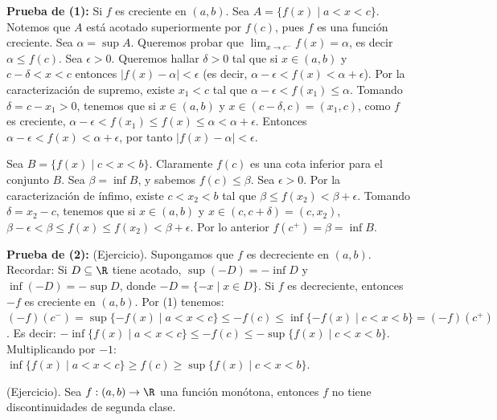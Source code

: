 \begin{dem} %
\textbf{Prueba de (1):} Si $f$ es creciente en $(a,b)$. %
Sea $A = \{f(x) \mid a < x < c\}$. Notemos que $A$ está acotado superiormente por $f(c)$, pues $f$ es una función creciente. %
Sea $\alpha = \sup A$. Queremos probar que $\lim_{x \to c^-} f(x) = \alpha$, es decir $\alpha \le f(c)$. %
Sea $\epsilon > 0$. Queremos hallar $\delta > 0$ tal que si $x \in (a,b)$ y $c - \delta < x < c$ entonces $|f(x) - \alpha| < \epsilon$ (es decir, $\alpha - \epsilon < f(x) < \alpha + \epsilon$). %
Por la caracterización de supremo, existe $x_1 < c$ tal que $\alpha - \epsilon < f(x_1) \le \alpha$. %
Tomando $\delta = c - x_1 > 0$, tenemos que si $x \in (a,b)$ y $x \in (c-\delta, c) = (x_1, c)$, como $f$ es creciente, $\alpha - \epsilon < f(x_1) \le f(x) \le \alpha < \alpha + \epsilon$. %
Entonces $\alpha - \epsilon < f(x) < \alpha + \epsilon$, por tanto $|f(x) - \alpha| < \epsilon$. %

Sea $B = \{f(x) \mid c < x < b\}$. Claramente $f(c)$ es una cota inferior para el conjunto $B$. %
Sea $\beta = \inf B$, y sabemos $f(c) \le \beta$. Sea $\epsilon > 0$. %
Por la caracterización de ínfimo, existe $c < x_2 < b$ tal que $\beta \le f(x_2) < \beta + \epsilon$. %
Tomando $\delta = x_2 - c$, tenemos que si $x \in (a,b)$ y $x \in (c, c+\delta) = (c, x_2)$, %
$\beta - \epsilon < \beta \le f(x) \le f(x_2) < \beta + \epsilon$. %
Por lo anterior $f(c^+) = \beta = \inf B$. %

\textbf{Prueba de (2):} (Ejercicio). Supongamos que $f$ es decreciente en $(a,b)$. %
Recordar: Si $D \subseteq \R$ tiene acotado, $\sup(-D) = -\inf D$ y $\inf(-D) = -\sup D$, donde $-D = \{-x \mid x \in D\}$. %
Si $f$ es decreciente, entonces $-f$ es creciente en $(a,b)$. Por (1) tenemos: %
$(-f)(c^-) = \sup\{-f(x) \mid a < x < c\} \le -f(c) \le \inf\{-f(x) \mid c < x < b\} = (-f)(c^+)$. %
Es decir: $-\inf\{f(x) \mid a < x < c\} \le -f(c) \le -\sup\{f(x) \mid c < x < b\}$. %
Multiplicando por $-1$: $\inf\{f(x) \mid a < x < c\} \ge f(c) \ge \sup\{f(x) \mid c < x < b\}$. %
\end{dem}

\begin{corolario} %
(Ejercicio). Sea $f: (a,b) \to \R$ una función monótona, entonces $f$ no tiene discontinuidades de segunda clase. %
\end{corolario}

